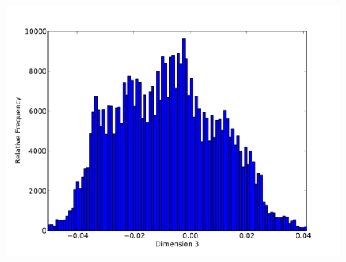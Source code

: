 \begin{figure}[h]
\begin{center}
		\begin{subfloat}[Dimension 3]{%
			\includegraphics[scale=0.36]{figures/histograms/armadillo_unique_2.pdf}
		}
		\end{subfloat}~
	\end{center}
\end{figure}

